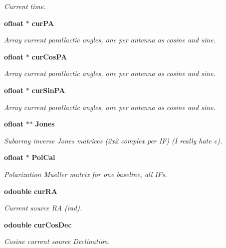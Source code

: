 \begin{CompactItemize}
\begin{CompactList}\small\item\em Current time. \item\end{CompactList}\item 
{\bf ofloat} $\ast$ {\bf cur\-PA}
\begin{CompactList}\small\item\em Array current parallactic angles, one per antenna as cosine and sine. \item\end{CompactList}\item 
{\bf ofloat} $\ast$ {\bf cur\-Cos\-PA}
\begin{CompactList}\small\item\em Array current parallactic angles, one per antenna as cosine and sine. \item\end{CompactList}\item 
{\bf ofloat} $\ast$ {\bf cur\-Sin\-PA}
\begin{CompactList}\small\item\em Array current parallactic angles, one per antenna as cosine and sine. \item\end{CompactList}\item 
{\bf ofloat} $\ast$$\ast$ {\bf Jones}
\begin{CompactList}\small\item\em Subarray inverse Jones matrices (2x2 complex per IF) (I really hate c). \item\end{CompactList}\item 
{\bf ofloat} $\ast$ {\bf Pol\-Cal}
\begin{CompactList}\small\item\em Polarization Mueller matrix for one baseline, all IFs. \item\end{CompactList}\item 
{\bf odouble} {\bf cur\-RA}
\begin{CompactList}\small\item\em Current source RA (rad). \item\end{CompactList}\item 
{\bf odouble} {\bf cur\-Cos\-Dec}
\begin{CompactList}\small\item\em Cosine current source Declination. \item\end{CompactList}\item 
$$
\end{CompactItemize}
